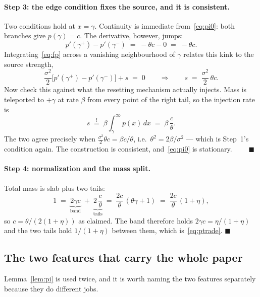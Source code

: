 \documentclass[11pt]{article}
\theoremstyle{definition}
\theoremstyle{remark}
\newcommand{\1}{\mathbf{1}}
\begin{document}
\paragraph{Step 3: the edge condition fixes the source, and it is consistent.}
Two conditions hold at $x = \gamma$. Continuity is immediate from~\eqref{eq:pi0}: both branches give $p(\gamma) = c$. The derivative, however, jumps:
\[
p'(\gamma^+) - p'(\gamma^-) \;=\; -\theta c - 0 \;=\; -\theta c .
\]
Integrating~\eqref{eq:fp} across a vanishing neighbourhood of $\gamma$ relates this kink to the source strength,
\[
\frac{\sigma^2}{2}\big[p'(\gamma^+) - p'(\gamma^-)\big] + s \;=\; 0
\qquad\Longrightarrow\qquad
s \;=\; \frac{\sigma^2}{2}\,\theta c .
\]
Now check this against what the resetting mechanism actually injects. Mass is teleported to $+\gamma$ at rate $\beta$ from every point of the right tail, so the injection rate is
\[
s \;\overset{!}{=}\; \beta \int_\gamma^\infty p(x)\,dx \;=\; \beta\,\frac{c}{\theta}.
\]
The two agree precisely when $\tfrac{\sigma^2}{2}\theta c = \beta c/\theta$, i.e.\ $\theta^2 = 2\beta/\sigma^2$ --- which is Step~1's condition again. The construction is consistent, and~\eqref{eq:pi0} is stationary. $\qquad\blacksquare$

\paragraph{Step 4: normalization and the mass split.}
Total mass is slab plus two tails:
\[
1 \;=\; \underbrace{2\gamma c}_{\text{band}} \;+\; \underbrace{2\,\frac{c}{\theta}}_{\text{tails}}
\;=\; \frac{2c}{\theta}\,(\theta\gamma + 1)
\;=\; \frac{2c}{\theta}\,(1+\eta),
\]
so $c = \theta/(2(1+\eta))$ as claimed. The band therefore holds $2\gamma c = \eta/(1+\eta)$ and the two tails hold $1/(1+\eta)$ between them, which is~\eqref{eq:ptrade}. \qquad$\blacksquare$

\subsection{The two features that carry the whole paper}

Lemma~\ref{lem:pi} is used twice, and it is worth naming the two features separately because they do different jobs.
\end{document}
